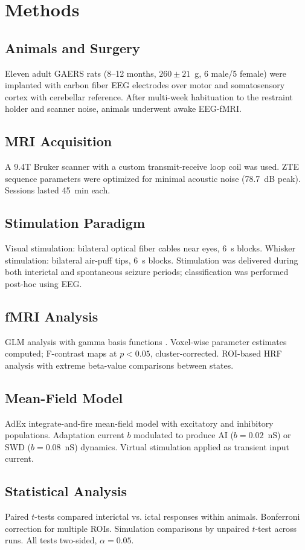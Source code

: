 \documentclass[11pt]{article}
\begin{document}
\section{Methods}

\subsection{Animals and Surgery}
Eleven adult GAERS rats (8--12 months, $260 \pm 21$~g, 6 male/5 female) were implanted with carbon fiber EEG electrodes over motor and somatosensory cortex with cerebellar reference. After multi-week habituation to the restraint holder and scanner noise, animals underwent awake EEG-fMRI.

\subsection{MRI Acquisition}
A 9.4T Bruker scanner with a custom transmit-receive loop coil was used. ZTE sequence parameters were optimized for minimal acoustic noise (78.7~dB peak). Sessions lasted 45~min each.

\subsection{Stimulation Paradigm}
Visual stimulation: bilateral optical fiber cables near eyes, 6~s blocks. Whisker stimulation: bilateral air-puff tips, 6~s blocks. Stimulation was delivered during both interictal and spontaneous seizure periods; classification was performed post-hoc using EEG.

\subsection{fMRI Analysis}
GLM analysis with gamma basis functions \citep{friston1994statistical}. Voxel-wise parameter estimates computed; F-contrast maps at $p < 0.05$, cluster-corrected. ROI-based HRF analysis with extreme beta-value comparisons between states.

\subsection{Mean-Field Model}
AdEx integrate-and-fire mean-field model with excitatory and inhibitory populations. Adaptation current $b$ modulated to produce AI ($b = 0.02$~nS) or SWD ($b = 0.08$~nS) dynamics. Virtual stimulation applied as transient input current.

\subsection{Statistical Analysis}
Paired $t$-tests compared interictal vs. ictal responses within animals. Bonferroni correction for multiple ROIs. Simulation comparisons by unpaired $t$-test across runs. All tests two-sided, $\alpha = 0.05$.
\end{document}
